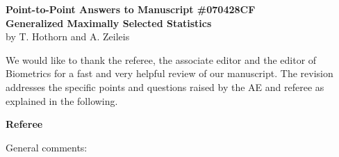 \documentclass[11pt,a4paper]{article}
\begin{document}
\begin{center}
\textbf{\large Point-to-Point Answers to Manuscript \#070428CF \\
Generalized Maximally Selected Statistics} \\
by T. Hothorn and A. Zeileis
\end{center}

We would like to thank the referee, the associate editor and the editor of Biometrics 
for a fast and very helpful review of our manuscript. The revision addresses
the specific points and questions raised by the AE and referee as explained 
in the following.

\vspace*{1cm}

\textbf{\large Referee}

General comments:
\end{document}
